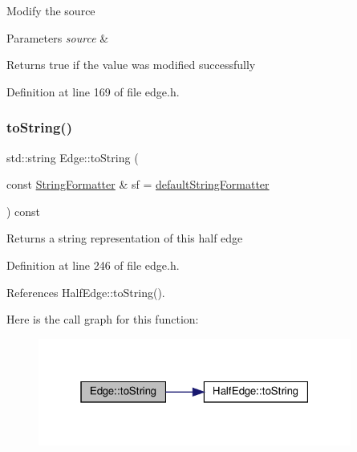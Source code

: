 Modify the source 
\begin{DoxyParams}{Parameters}
{\em source} & \\
\hline
\end{DoxyParams}
\begin{DoxyReturn}{Returns}
true if the value was modified successfully 
\end{DoxyReturn}


Definition at line 169 of file edge.\+h.

\mbox{\label{classEdge_a06b741951595a14e27691999ff82957e}} 
\subsubsection{\texorpdfstring{to\+String()}{toString()}}
{\footnotesize\ttfamily std\+::string Edge\+::to\+String (\begin{DoxyParamCaption}\item[{const \hyperlink{classStringFormatter}{String\+Formatter} \&}]{sf = {\ttfamily \hyperlink{stringFormatter_8h_abf1349c8e24162d0134072aff288f2a2}{default\+String\+Formatter}} }\end{DoxyParamCaption}) const\hspace{0.3cm}{\ttfamily [inline]}}

\begin{DoxyReturn}{Returns}
a string representation of this half edge 
\end{DoxyReturn}


Definition at line 246 of file edge.\+h.



References Half\+Edge\+::to\+String().

Here is the call graph for this function\+:
\nopagebreak
\begin{figure}[H]
\begin{center}
\leavevmode
\includegraphics[width=292pt]{classEdge_a06b741951595a14e27691999ff82957e_cgraph}
\end{center}
\end{figure}
\mbox{\label{classEdge_a9d5634336c89578f1bbbfce20c3938a7}} 
